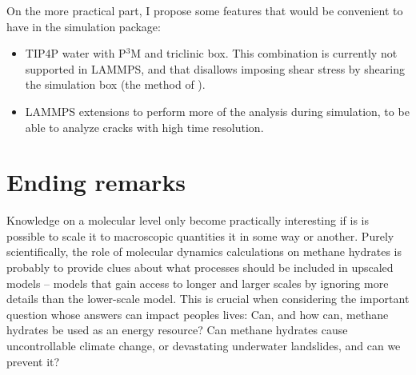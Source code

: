 On the more practical part, I propose some features that would be convenient to have in the simulation package:
\begin{itemize}
\item TIP4P water with P$^3$M and triclinic box. This combination is currently not supported in LAMMPS, and that disallows imposing shear stress by shearing the simulation box (the method of \citet{Parrinello1981}).
\item LAMMPS extensions to perform more of the analysis during simulation, to be able to analyze cracks with high time resolution.
\end{itemize}
 
\section{Ending remarks}
Knowledge on a molecular level only become practically interesting if is is possible to scale it to macroscopic quantities it in some way or another. Purely scientifically, the role of molecular dynamics calculations on methane hydrates is probably to provide clues about what processes should be included in upscaled models -- models that gain access to longer and larger scales by ignoring more details than the lower-scale model. This is crucial when considering the important question whose answers can impact peoples lives: Can, and how can, methane hydrates be used as an energy resource? Can methane hydrates cause uncontrollable climate change, or devastating underwater landslides, and can we prevent it? 